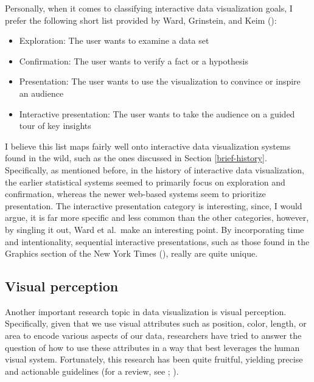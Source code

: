 \documentclass[
]{book}
\providecommand{\tightlist}{%
  \setlength{\itemsep}{0pt}\setlength{\parskip}{0pt}}
\begin{document}
Personally, when it comes to classifying interactive data visualization goals, I prefer the following short list provided by Ward, Grinstein, and Keim ():

\begin{itemize}
\tightlist
\item
  Exploration: The user wants to examine a data set
\item
  Confirmation: The user wants to verify a fact or a hypothesis
\item
  Presentation: The user wants to use the visualization to convince or inspire an audience
\item
  Interactive presentation: The user wants to take the audience on a guided tour of key insights
\end{itemize}

I believe this list maps fairly well onto interactive data visualization systems found in the wild, such as the ones discussed in Section \ref{brief-history}. Specifically, as mentioned before, in the history of interactive data visualization, the earlier statistical systems seemed to primarily focus on exploration and confirmation, whereas the newer web-based systems seem to prioritize presentation. The interactive presentation category is interesting, since, I would argue, it is far more specific and less common than the other categories, however, by singling it out, Ward et al.~make an interesting point. By incorporating time and intentionality, sequential interactive presentations, such as those found in the Graphics section of the New York Times (), really are quite unique.

\subsection{Visual perception}\label{visual-perception}

Another important research topic in data visualization is visual perception. Specifically, given that we use visual attributes such as position, color, length, or area to encode various aspects of our data, researchers have tried to answer the question of how to use these attributes in a way that best leverages the human visual system. Fortunately, this research has been quite fruitful, yielding precise and actionable guidelines (for a review, see ; ).
\end{document}
